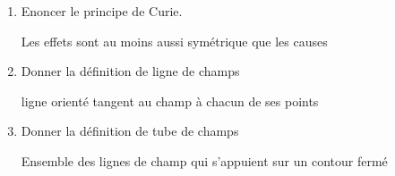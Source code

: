 \documentclass{article}
\begin{document}
\begin{enumerate}[label=\arabic{enumi} - , left=0pt, itemsep=1em]
\begin{solution}
    \end{solution}
        \item Enoncer le principe de Curie. \par
    \begin{solution}
     Les effets sont au moins aussi symétrique que les causes
     \end{solution}
     \item Donner la définition de ligne de champs \par
     \begin{solution}
      ligne orienté tangent au champ à chacun de ses points
     \end{solution}
     \item Donner la définition de tube de champs \par
     \begin{solution}
      Ensemble des lignes de champ qui s'appuient sur un contour fermé 
     \end{solution}
\end{enumerate}
\newpage
\end{document}
